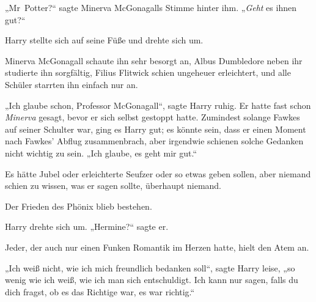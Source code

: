 „Mr~Potter?“ sagte Minerva McGonagalls Stimme hinter ihm.
„\emph{Geht} es ihnen gut?“

Harry stellte sich auf seine Füße und drehte sich um.

Minerva McGonagall schaute ihn sehr besorgt an, Albus Dumbledore neben ihr studierte ihn sorgfältig, Filius Flitwick schien ungeheuer erleichtert, und alle Schüler starrten ihn einfach nur an.

„Ich glaube schon, Professor McGonagall“, sagte Harry ruhig. Er hatte fast schon \emph{Minerva} gesagt, bevor er sich selbst gestoppt hatte. Zumindest solange Fawkes auf seiner Schulter war, ging es Harry gut; es könnte sein, dass er einen Moment nach Fawkes’ Abflug zusammenbrach, aber irgendwie schienen solche Gedanken nicht wichtig zu sein.
„Ich glaube, es geht mir gut.“

Es hätte Jubel oder erleichterte Seufzer oder so etwas geben sollen, aber niemand schien zu wissen, was er sagen sollte, überhaupt niemand.

Der Frieden des Phönix blieb bestehen.

Harry drehte sich um.
„Hermine?“ sagte er.

Jeder, der auch nur einen Funken Romantik im Herzen hatte, hielt den Atem an.

„Ich weiß nicht, wie ich mich freundlich bedanken soll“, sagte Harry leise, „so wenig wie ich weiß, wie ich man sich entschuldigt. Ich kann nur sagen, falls du dich fragst, ob es das Richtige war, es war richtig.“

